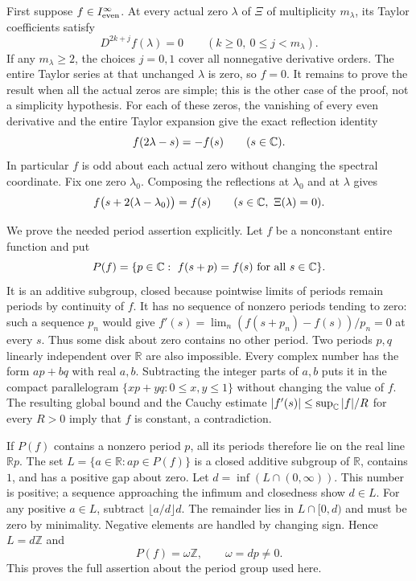 First suppose $f\in I_{\rm even}^{\infty}$. At every actual
zero $\lambda$ of $\Xi$ of multiplicity $m_\lambda$, its
Taylor coefficients satisfy
\[
 D^{2k+j}f(\lambda)=0
 \qquad(k\geq0,\ 0\leq j<m_\lambda).
\]
If any $m_\lambda\geq2$, the choices $j=0,1$ cover all
nonnegative derivative orders. The entire Taylor series at that
unchanged $\lambda$ is zero, so $f=0$. It remains to prove
the result when all the actual zeros are simple; this is the
other case of the proof, not a simplicity hypothesis.
For each of these zeros, the vanishing of every even derivative
and the entire Taylor expansion give the exact reflection identity
\begin{equation}\label{eq:cq-heat-core-reflections}
 f(2\lambda-s)=-f(s)\qquad(s\in\mathbb C).
\end{equation}
In particular $f$ is odd about each actual zero without changing
the spectral coordinate. Fix one zero $\lambda_0$.
Composing the reflections at $\lambda_0$ and at $\lambda$ gives
\begin{equation}\label{eq:cq-heat-core-periods}
 f\bigl(s+2(\lambda-\lambda_0)\bigr)=f(s)
 \qquad(s\in\mathbb C,\ \Xi(\lambda)=0).
\end{equation}

We prove the needed period assertion explicitly. Let $f$ be a
nonconstant entire function and put
\[
 P(f)=\{p\in\mathbb C:\ f(s+p)=f(s)\text{ for all }s\in\mathbb C\}.
\]
It is an additive subgroup, closed because pointwise limits of
periods remain periods by continuity of $f$. It has no sequence
of nonzero periods tending to zero: such a sequence $p_n$ would
give
$f'(s)=\lim_n(f(s+p_n)-f(s))/p_n=0$ at every $s$.
Thus some disk about zero contains no other period.
Two periods $p,q$ linearly independent over $\mathbb R$ are
also impossible. Every complex number has the form $ap+bq$
with real $a,b$. Subtracting the integer parts of $a,b$
puts it in the compact parallelogram
$\{xp+yq:0\leq x,y\leq1\}$ without changing the value of $f$.
The resulting global bound and the Cauchy estimate
$|f'(s)|\leq\sup_{\mathbb C}|f|/R$ for every $R>0$ imply that
$f$ is constant, a contradiction.

If $P(f)$ contains a nonzero period $p$, all its periods
therefore lie on the real line $\mathbb Rp$. The set
$L=\{a\in\mathbb R:ap\in P(f)\}$ is a closed additive subgroup
of $\mathbb R$, contains $1$, and has a positive gap about zero.
Let $d=\inf(L\cap(0,\infty))$. This number is positive; a
sequence approaching the infimum and closedness show $d\in L$.
For any positive $a\in L$, subtract
$\lfloor a/d\rfloor d$. The remainder lies in $L\cap[0,d)$
and must be zero by minimality. Negative elements are handled
by changing sign. Hence $L=d\mathbb Z$ and
\[
 P(f)=\omega\mathbb Z,\qquad\omega=dp\ne0.
\]
This proves the full assertion about the period group used here.

